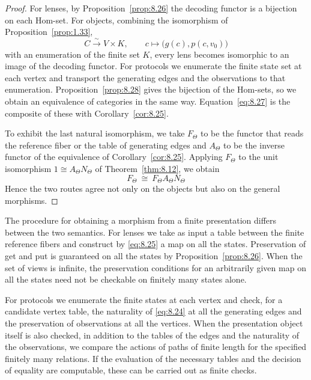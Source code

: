 \begin{proof}

For lenses, by Proposition~\ref{prop:8.26} the decoding functor is a bijection on each
Hom-set.
For objects, combining the isomorphism of Proposition~\ref{prop:1.33},
\begin{equation*}
C\xrightarrow{\sim}V\times K,\qquad
c\longmapsto\bigl(g(c),p(c,v_0)\bigr)
\tag{8.28}\label{eq:8.28}
\end{equation*}
with an enumeration of the finite set $K$, every lens becomes isomorphic to an image of the
decoding functor.
For protocols we enumerate the finite state set at each vertex and transport the generating
edges and the observations to that enumeration.
Proposition~\ref{prop:8.28} gives the bijection of the Hom-sets, so we obtain an equivalence
of categories in the same way.
Equation~\eqref{eq:8.27} is the composite of these with Corollary~\ref{cor:8.25}.

To exhibit the last natural isomorphism, we take $F_\Theta$ to be the functor that reads the
reference fiber or the table of generating edges and $A_\Theta$ to be the inverse functor of
the equivalence of Corollary~\ref{cor:8.25}.
Applying $F_\Theta$ to the unit isomorphism $1\cong A_\Theta N_\Theta$ of
Theorem~\ref{thm:8.12}, we obtain
\begin{equation*}
F_\Theta
\ \cong\
F_\Theta A_\Theta N_\Theta
\tag{8.29}\label{eq:8.29}
\end{equation*}
Hence the two routes agree not only on the objects but also on the general morphisms.

\end{proof}

The procedure for obtaining a morphism from a finite presentation differs between the two
semantics.
For lenses we take as input a table between the finite reference fibers and construct by
\eqref{eq:8.25} a map on all the states.
Preservation of get and put is guaranteed on all the states by Proposition~\ref{prop:8.26}.
When the set of views is infinite, the preservation conditions for an arbitrarily given map on all
the states need not be checkable on finitely many states alone.

For protocols we enumerate the finite states at each vertex and check, for a candidate vertex
table, the naturality of \eqref{eq:8.24} at all the generating edges and the preservation of
observations at all the vertices.
When the presentation object itself is also checked, in addition to the tables of the edges
and the naturality of the observations, we compare the actions of paths of finite length for
the specified finitely many relations.
If the evaluation of the necessary tables and the decision of equality are computable, these
can be carried out as finite checks.

